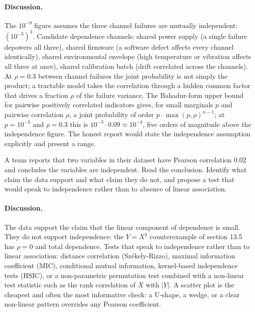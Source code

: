 \paragraph{Discussion.}
The $10^{-9}$ figure assumes the three channel failures are
mutually independent: $(10^{-3})^{3}$. Candidate dependence
channels: shared power supply (a single failure depowers all three),
shared firmware (a software defect affects every channel identically),
shared environmental envelope (high temperature or vibration affects
all three at once), shared calibration batch (drift correlated across
the channels). At $\rho = 0.3$ between channel failures the joint
probability is not simply the product; a tractable model takes the
correlation through a hidden common factor that drives a fraction
$\rho$ of the failure variance. The Bahadur-form upper bound for
pairwise positively correlated indicators gives, for small marginals
$p$ and pairwise correlation $\rho$, a joint probability of order
$p \cdot \max(p, \rho)^{n - 1}$; at $p = 10^{-3}$ and $\rho = 0.3$
this is $10^{-3} \cdot 0.09 \approx 10^{-4}$, five orders of
magnitude above the independence figure. The honest report would
state the independence assumption explicitly and present a range.

\begin{exercise}
A team reports that two variables in their dataset have Pearson
correlation $0.02$ and concludes the variables are independent. Read
the conclusion. Identify what claim the data support and what claim
they do not, and propose a test that would speak to independence
rather than to absence of linear association.
\end{exercise}

\paragraph{Discussion.}
The data support the claim that the linear component of dependence
is small. They do not support independence: the $Y = X^{2}$
counterexample of section 13.5 has $\rho = 0$ and total dependence.
Tests that speak to independence rather than to linear association:
distance correlation (Sz{\'e}kely-Rizzo), maximal information
coefficient (MIC), conditional mutual information, kernel-based
independence tests (HSIC), or a non-parametric permutation test
combined with a non-linear test statistic such as the rank
correlation of $X$ with $|Y|$. A scatter plot is the cheapest and
often the most informative check: a U-shape, a wedge, or a clear
non-linear pattern overrides any Pearson coefficient.

